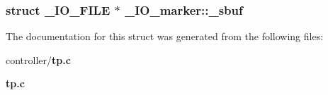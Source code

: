 \subsubsection[{\_\-sbuf}]{\setlength{\rightskip}{0pt plus 5cm}struct {\bf \_\-IO\_\-FILE} $\ast$ {\bf \_\-IO\_\-marker::\_\-sbuf}}\label{struct__IO__marker_a22a90f010ddf7a54200e21ff02336cd9}


The documentation for this struct was generated from the following files:\begin{DoxyCompactItemize}
\item 
controller/{\bf tp.c}\item 
{\bf tp.c}\end{DoxyCompactItemize}
